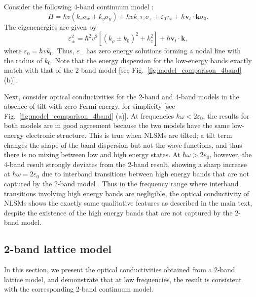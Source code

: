 \documentclass[aps,twocolumn,floatfix]{revtex4-1}
\begin{document}
Consider the following 4-band continuum model \cite{SM_Burkov2011,SM_Koshino2016}:
\begin{equation}\label{eq:hamiltonian_4band}
H=\hbar v (k_x\sigma_x+k_y\sigma_y) + \hbar v k_z \tau_z \sigma_z+\varepsilon_0 \tau_x +\hbar \bm{v}_{t}\cdot\bm{k}\sigma_0.
\end{equation}
The eigenenergies are given by
\begin{equation}
\varepsilon_{\pm}^2=\hbar^2v^2\left[(k_{\rho}\pm k_0)^2 + k_z^2\right] +\hbar \bm{v}_{t}\cdot\bm{k},
\end{equation}
where $\varepsilon_0=\hbar v k_0$. Thus, $\varepsilon_{-}$ has zero energy solutions 
forming a nodal line with the radius of $k_0$. Note that the energy dispersion for the low-energy bands exactly match with that of the 2-band model
[see Fig.~\ref{fig:model_comparison_4band} (b)].

Next, consider optical conductivities for the 2-band and 4-band models in the absence of tilt with zero Fermi energy, for simplicity [see Fig.~\ref{fig:model_comparison_4band} (a)].
At frequencies $\hbar\omega<2\varepsilon_0$, the results for both models are in good agreement because the two models have the same low-energy electronic structure. This is true when NLSMs are tilted; a tilt term changes the shape of the band dispersion but not the wave functions, and thus there is no mixing between low and high energy states.
At $\hbar\omega>2\varepsilon_0$, however, the 4-band result strongly deviates from the 2-band result, showing a sharp increase at $\hbar\omega=2\varepsilon_0$ due to interband transitions between high energy bands that are not captured by the 2-band model \cite{SM_Carbotte2017}.
Thus in the frequency range where interband transitions involving high energy bands are negligible, the optical conductivity of NLSMs shows the exactly same qualitative features as described in the main text, despite the existence of the high energy bands that are not captured by the 2-band model.

\subsection{2-band lattice model}

In this section, we present the optical conductivities obtained from a 2-band lattice model, and demonstrate that at low frequencies, the result is consistent with the corresponding 2-band continuum model.
\end{document}
